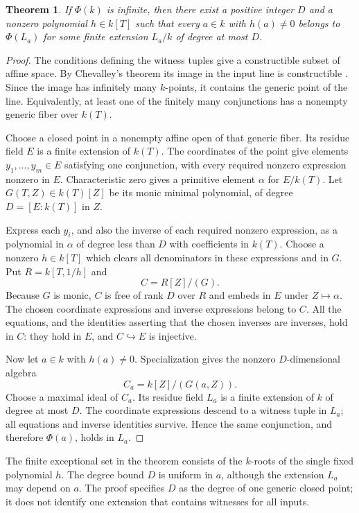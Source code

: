\documentclass[11pt,a4paper]{article}
\newtheorem{theorem}{Theorem}[section]
\theoremstyle{definition}\newtheorem{definition}[theorem]{Definition}
\theoremstyle{remark}\newtheorem{remark}[theorem]{Remark}
\begin{document}
\begin{theorem}\label{sys:bounded-extension}
If $\Phi(k)$ is infinite, then there exist a positive integer
$D$ and a nonzero polynomial $h\in k[T]$ such that every
$a\in k$ with $h(a)\ne0$ belongs to $\Phi(L_a)$ for some finite
extension $L_a/k$ of degree at most $D$.
\end{theorem}
\begin{proof}
The conditions defining the witness tuples give a constructible
subset of affine space. By Chevalley's theorem its image in
the input line is constructible \cite{StacksChevalley}. Since
the image has infinitely many $k$-points, it contains the
generic point of the line. Equivalently, at least one of the
finitely many conjunctions has a nonempty generic fiber over
$k(T)$.

Choose a closed point in a nonempty affine open of that generic
fiber. Its residue field $E$ is a finite extension of $k(T)$.
The coordinates of the point give elements
$y_1,\ldots,y_m\in E$ satisfying one conjunction, with every
required nonzero expression nonzero in $E$. Characteristic zero
gives a primitive element $\alpha$ for $E/k(T)$. Let
$G(T,Z)\in k(T)[Z]$ be its monic minimal polynomial, of
degree $D=[E:k(T)]$ in $Z$.

Express each $y_i$, and also the inverse of each required
nonzero expression, as a polynomial in $\alpha$ of degree
less than $D$ with coefficients in $k(T)$. Choose a nonzero
$h\in k[T]$ which clears all denominators in these expressions
and in $G$. Put $R=k[T,1/h]$ and
\[
                              C=R[Z]/(G).
\]
Because $G$ is monic, $C$ is free of rank $D$ over $R$ and
embeds in $E$ under $Z\mapsto\alpha$. The chosen coordinate
expressions and inverse expressions belong to $C$. All the
equations, and the identities asserting that the chosen inverses
are inverses, hold in $C$: they hold in $E$, and $C\hookrightarrow E$
is injective.

Now let $a\in k$ with $h(a)\ne0$. Specialization gives the
nonzero $D$-dimensional algebra
\[
                             C_a=k[Z]/(G(a,Z)).
\]
Choose a maximal ideal of $C_a$. Its residue field $L_a$ is a
finite extension of $k$ of degree at most $D$. The coordinate
expressions descend to a witness tuple in $L_a$; all equations
and inverse identities survive. Hence the same conjunction,
and therefore $\Phi(a)$, holds in $L_a$.
\end{proof}

The finite exceptional set in the theorem consists of the
$k$-roots of the single fixed polynomial $h$. The degree bound
$D$ is uniform in $a$, although the extension $L_a$ may depend
on $a$. The proof specifies $D$ as the degree of one generic
closed point; it does not identify one extension that contains
witnesses for all inputs.
\end{document}
